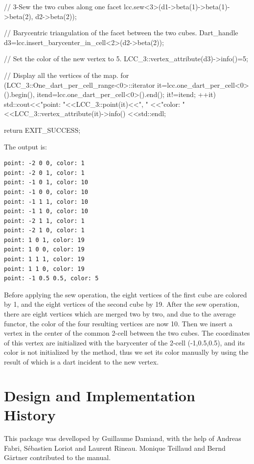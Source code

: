 \begin{ccExampleCode}
{  // 3-Sew the two cubes along one facet
  lcc.sew<3>(d1->beta(1)->beta(1)->beta(2), d2->beta(2));

  // Barycentric triangulation of the facet between the two cubes.
  Dart_handle d3=lcc.insert_barycenter_in_cell<2>(d2->beta(2));

  // Set the color of the new vertex to 5.
  LCC_3::vertex_attribute(d3)->info()=5;
  
  // Display all the vertices of the map.
  for (LCC_3::One_dart_per_cell_range<0>::iterator 
       it=lcc.one_dart_per_cell<0>().begin(), 
       itend=lcc.one_dart_per_cell<0>().end(); 
       it!=itend; ++it)
    {
      std::cout<<"point: "<<LCC_3::point(it)<<", "
               <<"color: "<<LCC_3::vertex_attribute(it)->info()
               <<std::endl;
    }

  return EXIT_SUCCESS;
}
\end{ccExampleCode}

The output is:
\begin{verbatim}
point: -2 0 0, color: 1
point: -2 0 1, color: 1
point: -1 0 1, color: 10
point: -1 0 0, color: 10
point: -1 1 1, color: 10
point: -1 1 0, color: 10
point: -2 1 1, color: 1
point: -2 1 0, color: 1
point: 1 0 1, color: 19
point: 1 0 0, color: 19
point: 1 1 1, color: 19
point: 1 1 0, color: 19
point: -1 0.5 0.5, color: 5
\end{verbatim}

Before applying the sew operation, the eight vertices of the first
cube are colored by 1, and the eight vertices of the second cube by
19. After the sew operation, there are eight vertices which are merged
two by two, and due to the average functor, the color of the four
resulting vertices are now 10. Then we insert a vertex in the center
of the common 2-cell between the two cubes.  The coordinates of this
vertex are initialized with the barycenter of the 2-cell
(-1,0.5,0.5), and its color is not initialized by the method, thus we
set its color manually by using the result of
 which is a dart incident to the
new vertex.

\section{Design and Implementation History}
%
This package was develloped by Guillaume Damiand, with the help of
Andreas Fabri, S\'ebastien Loriot and Laurent Rineau.  Monique
Teillaud and Bernd G{\"a}rtner contributed to the manual.

